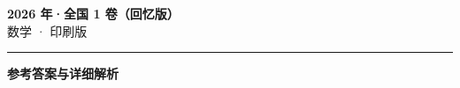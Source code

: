\documentclass[zihao=5, a4paper]{ctexart}
\begin{document}
\begin{center}
  {\Large\bfseries 2026 年·全国 1 卷（回忆版）}\\[4pt]
  {\large 数学 · 印刷版}
\end{center}
\medskip
{}

\par\bigskip\hrule\bigskip
{}
\begin{center}{\large\bfseries 参考答案与详细解析}\end{center}
\smallskip

\end{document}
